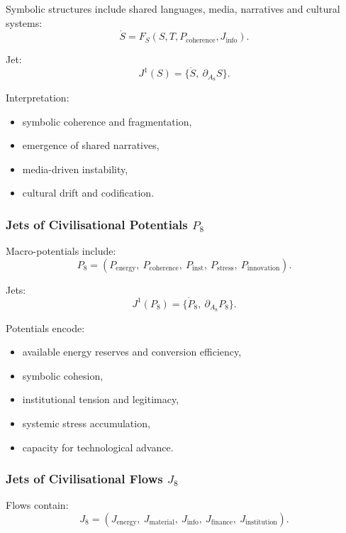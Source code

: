 Symbolic structures include shared languages, media, narratives and
cultural systems:
\[
\dot{S}=F_S(S, T, P_{\mathrm{coherence}}, J_{\mathrm{info}}).
\]

Jet:
\[
J^1(S)=\{\dot{S},\ \partial_{A_8}S\}.
\]

Interpretation:
\begin{itemize}
    \item symbolic coherence and fragmentation,
    \item emergence of shared narratives,
    \item media-driven instability,
    \item cultural drift and codification.
\end{itemize}


\subsubsection{Jets of Civilisational Potentials \texorpdfstring{$P_8$}{P_8}}

Macro-potentials include:
\[
P_8 =
(P_{\mathrm{energy}},\
 P_{\mathrm{coherence}},\
 P_{\mathrm{inst}},\
 P_{\mathrm{stress}},\
 P_{\mathrm{innovation}}).
\]

Jets:
\[
J^1(P_8)=\{\dot{P}_8,\ \partial_{A_8}P_8\}.
\]

Potentials encode:
\begin{itemize}
    \item available energy reserves and conversion efficiency,
    \item symbolic cohesion,
    \item institutional tension and legitimacy,
    \item systemic stress accumulation,
    \item capacity for technological advance.
\end{itemize}


\subsubsection{Jets of Civilisational Flows \texorpdfstring{$J_8$}{J_8}}

Flows contain:
\[
J_8=
(J_{\mathrm{energy}},\
 J_{\mathrm{material}},\
 J_{\mathrm{info}},\
 J_{\mathrm{finance}},\
 J_{\mathrm{institution}}).
\]

